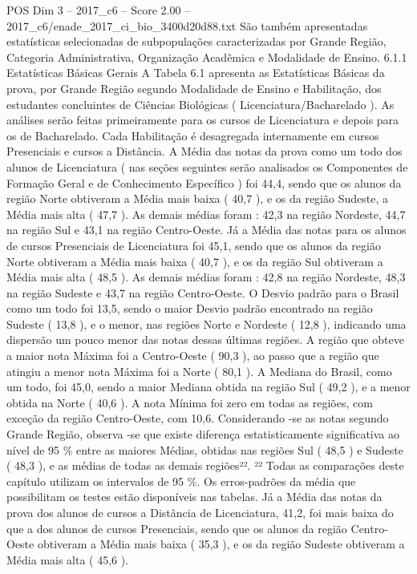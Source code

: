 \begin{textsample}{POS Dim 3 – 2017\_c6 – Score 2.00 – 2017\_c6/enade\_2017\_ci\_bio\_3400d20d88.txt}
São também apresentadas estatísticas selecionadas de subpopulações caracterizadas por Grande Região, Categoria Administrativa, Organização Acadêmica e Modalidade de Ensino. 6.1.1 Estatísticas Básicas Gerais A Tabela 6.1 apresenta as Estatísticas Básicas da prova, por Grande Região segundo Modalidade de Ensino e Habilitação, dos estudantes concluintes de Ciências Biológicas ( Licenciatura/Bacharelado ).
As análises serão feitas primeiramente para os cursos de Licenciatura e depois para os de Bacharelado.
Cada Habilitação é desagregada internamente em cursos Presenciais e cursos a Distância.
A Média das notas da prova como um todo dos alunos de Licenciatura ( nas seções seguintes serão analisados os Componentes de Formação Geral e de Conhecimento Específico ) foi 44,4, sendo que os alunos da região Norte obtiveram a Média mais baixa ( 40,7 ), e os da região Sudeste, a Média mais alta ( 47,7 ).
As demais médias foram : 42,3 na região Nordeste, 44,7 na região Sul e 43,1 na região Centro-Oeste.
Já a Média das notas para os alunos de cursos Presenciais de Licenciatura foi 45,1, sendo que os alunos da região Norte obtiveram a Média mais baixa ( 40,7 ), e os da região Sul obtiveram a Média mais alta ( 48,5 ).
As demais médias foram : 42,8 na região Nordeste, 48,3 na região Sudeste e 43,7 na região Centro-Oeste.
O Desvio padrão para o Brasil como um todo foi 13,5, sendo o maior Desvio padrão encontrado na região Sudeste ( 13,8 ), e o menor, nas regiões Norte e Nordeste ( 12,8 ), indicando uma dispersão um pouco menor das notas dessas últimas regiões.
A região que obteve a maior nota Máxima foi a Centro-Oeste ( 90,3 ), ao passo que a região que atingiu a menor nota Máxima foi a Norte ( 80,1 ).
A Mediana do Brasil, como um todo, foi 45,0, sendo a maior Mediana obtida na região Sul ( 49,2 ), e a menor obtida na Norte ( 40,6 ).
A nota Mínima foi zero em todas as regiões, com exceção da região Centro-Oeste, com 10,6.
Considerando -se as notas segundo Grande Região, observa -se que existe diferença estatisticamente significativa ao nível de 95 \% entre as maiores Médias, obtidas nas regiões Sul ( 48,5 ) e Sudeste ( 48,3 ), e as médias de todas as demais regiões²². ²² Todas as comparações deste capítulo utilizam os intervalos de 95 \%.
Os erros-padrões da média que possibilitam os testes estão disponíveis nas tabelas.
Já a Média das notas da prova dos alunos de cursos a Distância de Licenciatura, 41,2, foi mais baixa do que a dos alunos de cursos Presenciais, sendo que os alunos da região Centro-Oeste obtiveram a Média mais baixa ( 35,3 ), e os da região Sudeste obtiveram a Média mais alta ( 45,6 ).

\end{textsample}
